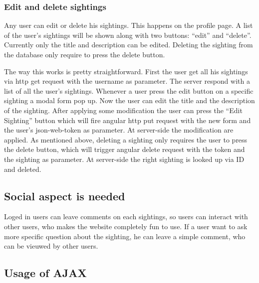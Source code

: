 \documentclass{article}
\begin{document}
\subsubsection{Edit and delete sightings}
Any user can edit or delete his sightings. This happens on the profile page. A list of the user’s sightings will be shown along with two buttons: “edit” and “delete”. Currently only the title and description can be edited. Deleting the sighting from the database only require to press the delete button.

The way this works is pretty straightforward. 
First the user get all his sightings via http get request with the username as parameter. The server respond with a list of all the user’s sightings. 
Whenever a user press the edit button on a specific sighting a modal form pop up. Now the user can edit the title and the description of the sighting. After applying some modification the user can press the “Edit Sighting” button which will fire angular http put request with the new form and the user’s json-web-token as parameter. At server-side the modification are applied.
As mentioned above, deleting a sighting only requires the user to press the delete button, which will trigger angular delete request with the token and the sighting as parameter. At server-side the right sighting is looked up via ID and deleted.



\subsection{Social aspect is needed}
Loged in users can leave comments on each sightings, so users can interact with other users, who makes the website completely fun to use. If a user want to ask more specific question about the sighting, he can leave a simple comment, who can be vieuwed by other users.
\subsection{Usage of AJAX}
\end{document}
